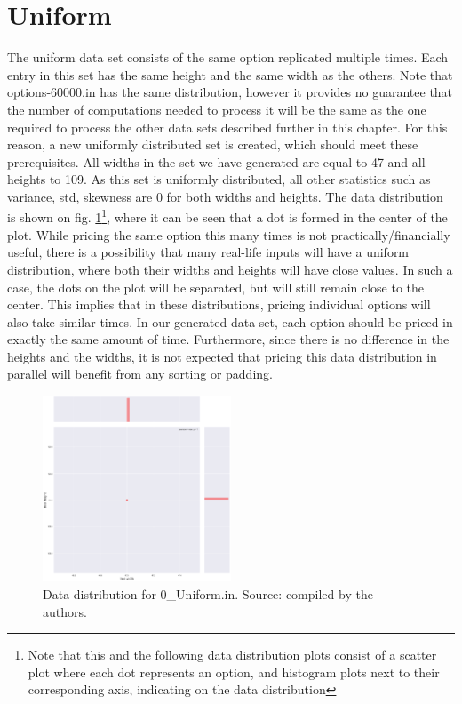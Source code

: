 \section{Uniform}
The uniform data set consists of the same option replicated multiple times. Each entry in this set has the same height and the same width as the others. Note that options-60000.in has the same distribution, however it provides no guarantee that the number of computations needed to process it will be the same as the one required to process the other data sets described further in this chapter. For this reason, a new uniformly distributed set is created, which should meet these prerequisites. All widths in the set we have generated are equal to 47 and all heights to 109. As this set is uniformly distributed, all other statistics such as variance, std, skewness are 0 for both widths and heights. The data distribution is shown on fig. \ref{fig:data:uniform}\footnote{Note that this and the following data distribution plots consist of a scatter plot where each dot represents an option, and histogram plots next to their corresponding axis, indicating on the data distribution}, where it can be seen that a dot is formed in the center of the plot. While pricing the same option this many times is not practically/financially useful, there is a possibility that many real-life inputs will have a uniform distribution, where both their widths and heights will have close values. In such a case, the dots on the plot will be separated, but will still remain close to the center. This implies that in these distributions, pricing individual options will also take similar times. In our generated data set, each option should be priced in exactly the same amount of time. Furthermore, since there is no difference in the heights and the widths, it is not expected that pricing this data distribution in parallel will benefit from any sorting or padding.   
 
 \begin{figure}[H]
	\centering
	\includegraphics[width=0.5\textwidth]{img/0_UNIFORM_plot.png}
	\caption{Data distribution for 0\_Uniform.in. Source: compiled by the authors.}
	\label{fig:data:uniform}
\end{figure}

